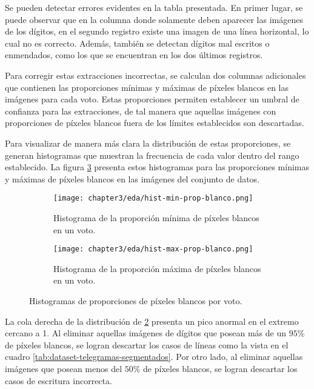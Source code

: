 Se pueden detectar errores evidentes en la tabla presentada. En primer lugar, se puede observar que en la columna donde
solamente deben aparecer las imágenes de los dígitos, en el segundo registro existe una imagen de una línea horizontal,
lo cual no es correcto. Además, también se detectan dígitos mal escritos o enmendados, como los que se encuentran en
los dos últimos registros.

Para corregir estas extracciones incorrectas, se calculan dos columnas adicionales que contienen las proporciones
mínimas y máximas de píxeles blancos en las imágenes para cada voto. Estas proporciones permiten establecer un umbral
de confianza para las extracciones, de tal manera que aquellas imágenes con proporciones de píxeles blancos fuera de
los límites establecidos son descartadas.

Para visualizar de manera más clara la distribución de estas proporciones, se generan histogramas que muestran la
frecuencia de cada valor dentro del rango establecido. La figura \ref{fig:histogramas-min-max-prop-blanco} presenta
estos histogramas para las proporciones mínimas y máximas de píxeles blancos en las imágenes del conjunto de datos.

\begin{figure}[H]
    \centering
    \begin{subfigure}[h]{0.48\textwidth}
        \texttt{[image: chapter3/eda/hist-min-prop-blanco.png]}
        \caption{Histograma de la proporción mínima de píxeles blancos en un voto.}
        \label{fig:histograma-min-prop-blanco}
    \end{subfigure}
    \hfill
    \begin{subfigure}[h]{0.48\textwidth}
        \texttt{[image: chapter3/eda/hist-max-prop-blanco.png]}
        \caption{Histograma de la proporción máxima de píxeles blancos en un voto.}
        \label{fig:histograma-max-prop-blanco}
    \end{subfigure}
    \caption[Histogramas de proporciones mínimas y máximas de píxeles blancos por voto]{Histogramas de proporciones de píxeles blancos por voto.}
    \label{fig:histogramas-min-max-prop-blanco}
\end{figure}

La cola derecha de la distribución de \ref{fig:histograma-max-prop-blanco} presenta un pico anormal en el extremo
cercano a 1. Al eliminar aquellas imágenes de dígitos que posean más de un $95\%$ de píxeles blancos, se logran
descartar los casos de líneas como la vista en el cuadro \ref{tab:dataset-telegramas-segmentados}. Por otro lado, al
eliminar aquellas imágenes que posean menos del $50\%$ de píxeles blancos, se logran descartar los casos de escritura
incorrecta.

